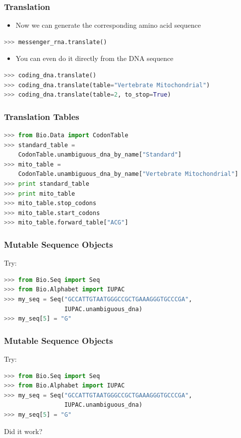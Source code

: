 \documentclass[xcolor=table,10pt,final]{beamer}
\begin{document}
\begin{frame}[fragile]
	\frametitle{Translation}
		\begin{itemize}
			\item Now we can generate the corresponding amino acid sequence
		\end{itemize}
		\begin{lstlisting}[language=python]
>>> messenger_rna.translate()
		\end{lstlisting}
		\begin{itemize}
			\item You can even do it directly from the DNA sequence
		\end{itemize}
		\begin{lstlisting}[language=python]
>>> coding_dna.translate()
>>> coding_dna.translate(table="Vertebrate Mitochondrial")
>>> coding_dna.translate(table=2, to_stop=True)
		\end{lstlisting}
\end{frame}


\begin{frame}[fragile]
	\frametitle{Translation Tables}
	\begin{lstlisting}[language=python]
>>> from Bio.Data import CodonTable
>>> standard_table =
    CodonTable.unambiguous_dna_by_name["Standard"]
>>> mito_table = 
    CodonTable.unambiguous_dna_by_name["Vertebrate Mitochondrial"]
>>> print standard_table
>>> print mito_table
>>> mito_table.stop_codons
>>> mito_table.start_codons
>>> mito_table.forward_table["ACG"]
	\end{lstlisting}
\end{frame}


\begin{frame}[fragile]
	\frametitle{Mutable Sequence Objects}
Try:
	\begin{lstlisting}[language=python]
>>> from Bio.Seq import Seq
>>> from Bio.Alphabet import IUPAC
>>> my_seq = Seq("GCCATTGTAATGGGCCGCTGAAAGGGTGCCCGA",
                 IUPAC.unambiguous_dna)
>>> my_seq[5] = "G"
	\end{lstlisting}
\end{frame}


\begin{frame}[fragile]
	\frametitle{Mutable Sequence Objects}
Try:
	\begin{lstlisting}[language=python]
>>> from Bio.Seq import Seq
>>> from Bio.Alphabet import IUPAC
>>> my_seq = Seq("GCCATTGTAATGGGCCGCTGAAAGGGTGCCCGA",
                 IUPAC.unambiguous_dna)
>>> my_seq[5] = "G"
	\end{lstlisting}
Did it work?\\
\end{frame}
\end{document}

